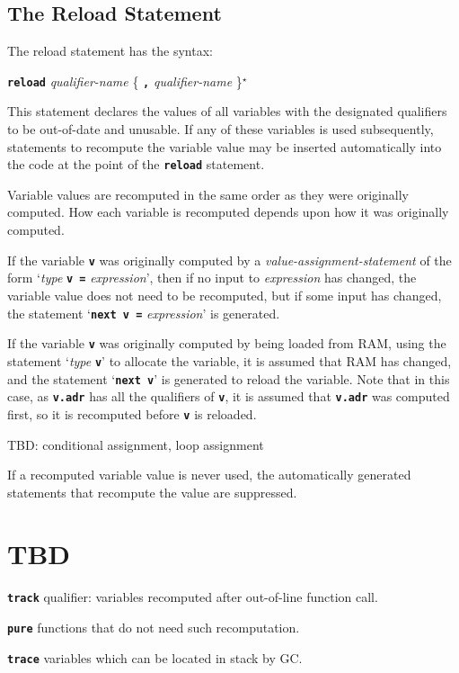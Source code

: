 \documentclass[12pt]{article}
\makeatletter
\newcommand{\TT}[1]{{\tt \bfseries #1}}
\newcommand{\ttkey}[1]{\TT{#1}\index{#1@{\tt #1}}}
\newcommand{\STAR}{{\Large $^\star$}}
\makeatother
\begin{document}
\subsection{The Reload Statement}
\label{THE-RELOAD-COMMAND}

The reload statement has the syntax:
\begin{center}
\ttkey{reload} {\em qualifier-name} \{ \TT{,} {\em qualifier-name} \}\STAR{}
\end{center}

This statement declares the values of all variables with the designated
qualifiers to be out-of-date and unusable.  If any of these variables
is used subsequently, statements to recompute the variable value
may be inserted automatically into the code at the point of the
\TT{reload} statement.

Variable values are recomputed in the same order as they were
originally computed.  How each variable is recomputed depends upon
how it was originally computed.

If the variable \TT{v} was originally computed by
a {\em value-assignment-statement}
of the form `{\em type} \TT{v =} {\em expression}', then if
no input to {\em expression} has changed, the variable value does not
need to be recomputed, but if some input has changed, the
statement `\TT{next v =} {\em expression}' is generated.

If the variable \TT{v} was originally computed by being loaded from
RAM, using the statement `{\em type} \TT{v}' to allocate the variable,
it is assumed that RAM has changed, and the statement `\TT{next v}' is
generated to reload the variable.  Note that in this case, as \TT{v.adr}
has all the qualifiers of \TT{v}, it is assumed that \TT{v.adr} was
computed first, so it is recomputed before \TT{v} is reloaded.

TBD: conditional assignment, loop assignment

If a recomputed variable value is never used, the automatically generated
statements that recompute the value are suppressed.

\section{TBD}

\TT{track} qualifier: variables recomputed after out-of-line
function call.

\TT{pure} functions that do not need such recomputation.

\TT{trace} variables which can be located in stack by GC.
\end{document}
